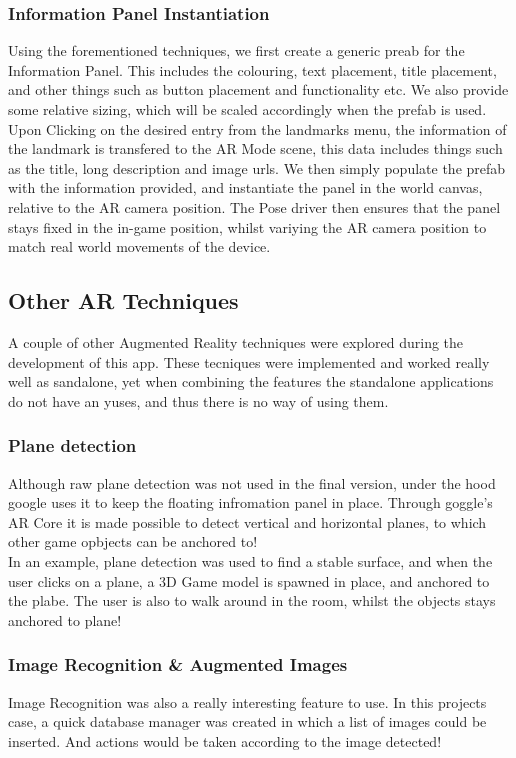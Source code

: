  \subsubsection{Information Panel Instantiation}
 Using the forementioned techniques, we first create a generic preab for the Information Panel. This includes the colouring, text placement, title placement, and 
 other things such as button placement and functionality etc. We also provide some relative sizing, which will be scaled accordingly when the prefab is used.\\
 Upon Clicking on the desired entry from the landmarks menu, the information of the landmark is transfered to the AR Mode scene, this data includes things such as 
 the title, long description and image urls. We then simply populate the prefab with the information provided, and instantiate the panel in the world canvas, 
 relative to the AR camera position. The Pose driver then ensures that the panel stays fixed in the in-game position, whilst variying the AR camera position to 
 match real world movements of the device. 



 \subsection{Other AR Techniques}
 A couple of other Augmented Reality techniques were explored during the development of this app. 
 These tecniques were implemented and worked really well as sandalone, yet when combining the features 
 the standalone applications do not have an yuses, and thus there is no way of using them. 
 \subsubsection{Plane detection}
 Although raw plane detection was not used in the final version, under the hood google uses it to keep the 
 floating infromation panel in place. Through goggle's AR Core it is made possible to detect vertical 
 and horizontal planes, to which other game opbjects can be anchored to!\\

 In an example, plane detection was used to find a stable surface, and when the user clicks on a 
 plane, a 3D Game model is spawned in place, and anchored to the plabe. The user is also to walk around 
 in the room, whilst the objects stays anchored to plane! 

 \subsubsection{Image Recognition \& Augmented Images}
 Image Recognition was also a really interesting feature to use. 
 In this projects case, a quick database manager was created in which a list of images could
  be inserted. And actions would be taken according to the image detected!\\

